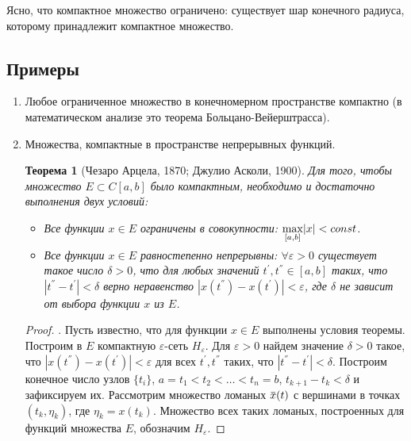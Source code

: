 \documentclass[12pt,a4paper,titlepage,oneside]{book}
\newcommand{\overbar}[1]{\mkern 1.5mu\overline{\mkern-1.5mu#1\mkern-1.5mu}\mkern 1.5mu}
\theoremstyle{definition}
\theoremstyle{plain}
\newtheorem*{theorem}{Теорема}
\theoremstyle{break}
\theoremstyle{remark}
\theoremstyle{remark}
\theoremstyle{remark}
\theoremstyle{remark}
\theoremstyle{plain}
\theoremstyle{plain}
\begin{document}
Ясно, что компактное множество ограничено: существует шар конечного радиуса, которому принадлежит компактное множество.

\subsection*{Примеры}
\begin{enumerate}

	\item Любое ограниченное множество в конечномерном пространстве компактно (в математическом анализе это теорема Больцано-Вейерштрасса).

	\item Множества, компактные в пространстве непрерывных функций.

\begin{theorem}[Чезаро Арцела, 1870; Джулио Асколи, 1900]
Для того, чтобы множество $E \subset C[a, b]$ было компактным, необходимо и достаточно выполнения двух условий:

\begin{itemize}

	\item  Все функции $x\in E$ ограничены в совокупности: $\smash{\displaystyle\max_{ [a,b]}} |x| < const$.

	\item  Все функции $x\in E$ равностепенно непрерывны: $\forall \varepsilon>0$ существует такое число $\delta>0$, что для любых значений $t^{'}, t^{''} \in [a, b]$ таких, что $|t^{''}-t^{'}| <\delta$ верно неравенство $|x(t^{''})-x(t^{'})| <\varepsilon$, где $\delta$ не зависит от выбора функции $x$ из $E$.
	
\end{itemize}

\end{theorem}
\begin{proof} 
	. Пусть известно, что для функции $x\in E$ выполнены условия теоремы. Построим в $E$ компактную 	$\varepsilon$-сеть $H_{\varepsilon}$. Для 	$ \varepsilon>0$ найдем значение $\delta>0$ такое, что $|x(t^{''})-x(t^{'})| <\varepsilon$ для всех $t^{'}, t^{''}$ таких, что $|t^{''}-t^{'}| <\delta$. Построим конечное число узлов $\{t_i\}$, $a=t_1<t_2<\ldots<t_n=b$, $t_{k+1}-t_k< \delta$ и зафиксируем их. Рассмотрим множество ломаных $\overbar{x}(t)$ с вершинами в точках $(t_k, \eta_k )$, где $\eta_k=x(t_k)$. Множество всех таких ломаных, построенных для функций множества $E$, обозначим $H_{\varepsilon}$.
	

\end{proof}
\end{enumerate}
\end{document}
